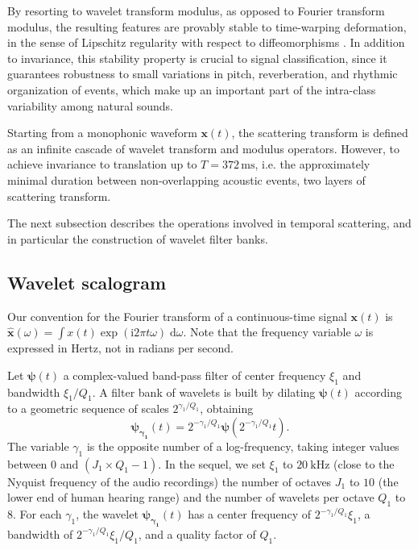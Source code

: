 \documentclass[journal]{IEEEtran}
\makeatletter
\newcommand*{\ie}{i.e.\@\xspace}
\makeatother
\begin{document}
By resorting to wavelet transform modulus, as opposed to Fourier transform modulus, the resulting features are provably stable to time-warping deformation,
in the sense of Lipschitz regularity with respect to diffeomorphisms \cite{Mallat2012}.
In addition to invariance, this stability property is crucial to signal classification, since it guarantees robustness to small variations in pitch, reverberation, and rhythmic organization of events, which make up an important part of the intra-class variability among natural sounds.

Starting from a monophonic waveform $\boldsymbol{x}(t)$, the scattering transform is defined as an infinite cascade of wavelet transform and modulus operators.
However, to achieve invariance to translation up to $T = 372\,\mathrm{ms}$, \ie the approximately minimal duration between non-overlapping acoustic events, two layers of scattering transform.

The next subsection describes the operations involved in temporal scattering, and in particular the construction of wavelet filter banks.

\subsection{Wavelet scalogram}
Our convention for the Fourier transform of a continuous-time signal $\boldsymbol{x}(t)$ is $\boldsymbol{\hat{x}}(\omega) = \int x(t) \exp(\mathrm{i} 2\pi t \omega) \; \mathrm{d}\omega$. Note that the frequency variable $\omega$ is expressed in Hertz, not in radians per second.

Let $\boldsymbol{\psi}(t)$ a complex-valued band-pass filter of
center frequency $\xi_1$ and bandwidth $\xi_1/Q_1$.
A filter bank of wavelets is built by dilating $\boldsymbol{\psi}(t)$
according to a geometric sequence of scales $2^{\gamma_1/Q_1}$, obtaining
\begin{equation}
\boldsymbol{\psi_{\gamma_1}}(t) = 2^{-\gamma_1/Q_1} \boldsymbol{\psi}(2^{-\gamma_1/Q_1} t)\mbox{.}
\end{equation}
The variable $\gamma_1$ is the opposite number of a log-frequency, taking integer values between $0$ and $(J_1 \times Q_1 - 1)$.
In the sequel, we set $\xi_1$ to $20~\mathrm{kHz}$ (close to the Nyquist frequency of the audio recordings) the number of octaves $J_1$ to $10$ (the lower end of human hearing range) and the number of wavelets per octave $Q_1$ to $8$.
For each $\gamma_1$, the wavelet $\boldsymbol{\psi_{\gamma_1}}(t)$
has a center frequency of $2^{-\gamma_1/Q_1}\xi_1$, a bandwidth of $2^{-\gamma_1/Q_1}\xi_1/Q_1$, and a quality factor of $Q_1$.
\end{document}
